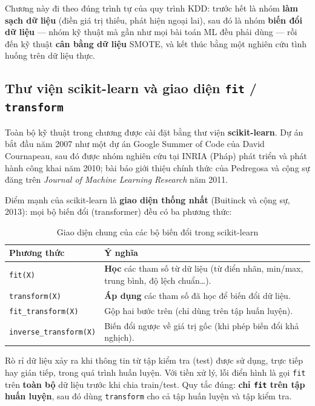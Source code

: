 Chương này đi theo đúng trình tự của quy trình KDD: trước hết là nhóm \textbf{làm sạch dữ liệu} (điền giá trị thiếu, phát hiện ngoại lai), sau đó là nhóm \textbf{biến đổi dữ liệu} --- nhóm kỹ thuật mà gần như mọi bài toán ML đều phải dùng --- rồi đến kỹ thuật \textbf{cân bằng dữ liệu} SMOTE, và kết thúc bằng một nghiên cứu tình huống trên dữ liệu thực.

\subsection{Thư viện scikit-learn và giao diện \texttt{fit} / \texttt{transform}}

Toàn bộ kỹ thuật trong chương được cài đặt bằng thư viện \textbf{scikit-learn}. Dự án bắt đầu năm 2007 như một dự án Google Summer of Code của David Cournapeau, sau đó được nhóm nghiên cứu tại INRIA (Pháp) phát triển và phát hành công khai năm 2010; bài báo giới thiệu chính thức của Pedregosa và cộng sự đăng trên \textit{Journal of Machine Learning Research} năm 2011.

Điểm mạnh của scikit-learn là \textbf{giao diện thống nhất} (Buitinck và cộng sự, 2013): mọi bộ biến đổi (transformer) đều có ba phương thức:

\begin{table}[H]
\centering
\begin{tabular}{|l|p{10cm}|}
\hline
\textbf{Phương thức} & \textbf{Ý nghĩa} \\
\hline
\texttt{fit(X)} & \textbf{Học} các tham số từ dữ liệu (từ điển nhãn, min/max, trung bình, độ lệch chuẩn\ldots). \\
\hline
\texttt{transform(X)} & \textbf{Áp dụng} các tham số đã học để biến đổi dữ liệu. \\
\hline
\texttt{fit\_transform(X)} & Gộp hai bước trên (chỉ dùng trên tập huấn luyện). \\
\hline
\texttt{inverse\_transform(X)} & Biến đổi ngược về giá trị gốc (khi phép biến đổi khả nghịch). \\
\hline
\end{tabular}
\caption{Giao diện chung của các bộ biến đổi trong scikit-learn}
\end{table}

\begin{definition}
Rò rỉ dữ liệu xảy ra khi thông tin từ tập kiểm tra (test) được sử dụng, trực tiếp hay gián tiếp, trong quá trình huấn luyện. Với tiền xử lý, lỗi điển hình là gọi \texttt{fit} trên \textbf{toàn bộ} dữ liệu trước khi chia train/test. Quy tắc đúng: \textbf{chỉ \texttt{fit} trên tập huấn luyện}, sau đó dùng \texttt{transform} cho cả tập huấn luyện và tập kiểm tra.
\end{definition}

